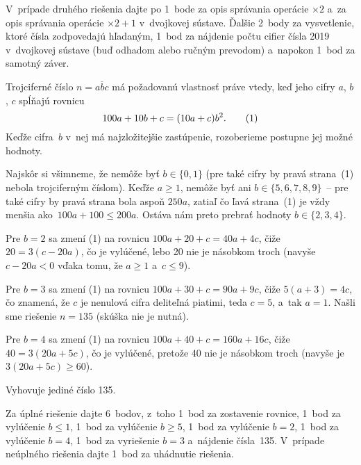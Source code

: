 {V~prípade druhého riešenia dajte po 1~bode za opis správania operácie $\times2$
a~za opis správania operácie $\times2 + 1$ v~dvojkovej sústave. Ďalšie
2~body za vysvetlenie, ktoré čísla zodpovedajú hľadaným, 1~bod za nájdenie
počtu cifier čísla 2019 v~dvojkovej sústave (buď odhadom alebo ručným prevodom)
a~napokon 1~bod za samotný záver.
\endpetit
\bigbreak
}

{%
Trojciferné číslo $n=\overline{abc}$ má požadovanú vlastnosť práve
vtedy, keď jeho cifry $a$, $b$, $c$ spĺňajú rovnicu
$$
100a+10b+c=(10a+c)b^2.
\tag1
$$
Keďže cifra~$b$ v~nej má najzložitejšie zastúpenie, rozoberieme
postupne jej možné hodnoty.

Najskôr si všimneme, že nemôže byť $b\in\{0,1\}$
(pre také cifry by pravá strana~(1) nebola
trojciferným číslom). Keďže $a\ge1$,
nemôže byť ani $b\in\{5, 6, 7, 8, 9\}$~-- pre také cifry by pravá
strana bola aspoň $250a$, zatiaľ čo ľavá strana~(1) je
vždy menšia ako~$100a+100\le200a$. Ostáva nám preto prebrať hodnoty
$b\in\{2, 3, 4\}$.

Pre $b=2$ sa zmení (1) na rovnicu $100a+20+c=40a+4c$, čiže
$20=3(c-20a)$, čo je vylúčené, lebo 20 nie je násobkom troch
(navyše $c-20a<0$ vďaka tomu, že $a\ge1$ a~$c\le9$).

Pre $b=3$ sa zmení (1) na rovnicu $100a+30+c=90a+9c$, čiže
$5(a+3)=4c$, čo znamená, že $c$ je nenulová cifra deliteľná
piatimi, teda $c=5$, a~tak $a=1$. Našli sme riešenie $n=135$ (skúška
nie je nutná).

Pre $b=4$ sa zmení (1) na rovnicu $100a+40+c=160a+16c$, čiže
$40=3(20a+5c)$, čo je vylúčené, pretože 40 nie je násobkom troch
(navyše je $3(20a+5c)\ge60$).

\odpoved
Vyhovuje jediné číslo 135.

\nobreak\medskip\petit\noindent
Za úplné riešenie dajte 6~bodov, z~toho
1~bod za zostavenie rovnice,
1~bod za vylúčenie $b\le 1$,
1~bod za vylúčenie $b\ge 5$,
1~bod za vylúčenie $b = 2$,
1~bod za vylúčenie $b = 4$,
1~bod za vyriešenie $b = 3$ a~nájdenie čísla~135.
V~prípade neúplného riešenia dajte 1~bod za uhádnutie riešenia.

\endpetit
\bigbreak
}

